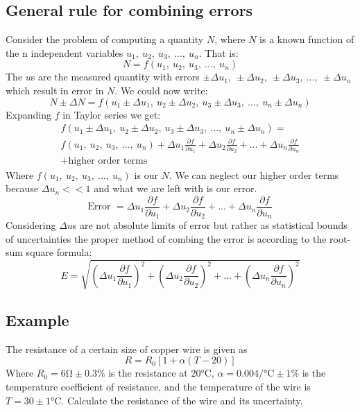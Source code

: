 \documentclass[class=report, crop=false, 12pt,a4paper]{standalone}
\begin{document}
\subsection{General rule for combining errors}
Consider the problem of computing a quantity $N$, where $N$ is a known function of the n independent variables $u_1, \ u_2, \ u_3, \ ..., \ u_n$. That is:
\begin{equation}
  N = f(u_1, \ u_2, \ u_3, \ ..., \ u_n)
\end{equation}
The $u$s are the measured quantity with errors $\pm \Delta u_1, \ \pm \Delta u_2, \ \pm \Delta u_3, \ ..., \ \pm \Delta u_n$ which result in error in $N$. We could now write:
\begin{equation}
  N \pm \Delta N = f(u_1 \pm \Delta u_1, \ u_2 \pm \Delta u_2, \ u_3 \pm \Delta u_3, \ ..., \ u_n \pm \Delta u_n)
\end{equation}
Expanding $f$ in Taylor series we get:
\begin{multline}
  f(u_1 \pm \Delta u_1, \ u_2 \pm \Delta u_2, \ u_3 \pm \Delta u_3, \ ..., \ u_n \pm \Delta u_n) = \\
  f(u_1, \ u_2, \ u_3, \ ..., \ u_n) + \Delta u_1 \frac{\partial f}{\partial u_1} + \Delta u_2 \frac{\partial f}{\partial u_2} + ... + \Delta u_n \frac{\partial f}{\partial u_n} \\ + \textrm{higher order terms}
\end{multline}
Where $f(u_1, \ u_2, \ u_3, \ ..., \ u_n)$ is our $N$. We can neglect our higher order terms because $\Delta u_n << 1$ and what we are left with is our error.
\begin{equation}
  \textrm{Error } = \Delta u_1 \frac{\partial f}{\partial u_1} + \Delta u_2 \frac{\partial f}{\partial u_2} + ... + \Delta u_n \frac{\partial f}{\partial u_n}
\end{equation}
Considering $\Delta u$s are not absolute limits of error but rather as statistical bounds of uncertainties the proper method of combing the error is according to the root-sum square formula:
\begin{equation}
  E = \sqrt{\left(\Delta u_1 \frac{\partial f}{\partial u_1}\right)^2 + \left(\Delta u_2 \frac{\partial f}{\partial u_2}\right)^2 + ... + \left(\Delta u_n \frac{\partial f}{\partial u_n}\right)^2}
\end{equation}
\subsection{Example}
The resistance of a certain size of copper wire is given as
\begin{equation}
  R = R_0 [1 + \alpha (T-20)]
\end{equation}
Where $R_0 = 6\si{\ohm} \pm 0.3\%$ is the resistance at 20\si{\celsius}, $\alpha = 0.004 \si{\per\celsius} \pm 1\%$ is the temperature coefficient of resistance, and the temperature of the wire is $T = 30 \pm 1 \si{\celsius}$. Calculate the resistance of the wire and its uncertainty. 
\end{document}
